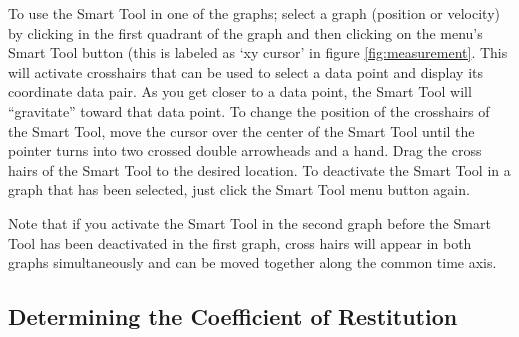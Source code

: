 To use the Smart Tool in one of the graphs; select a graph (position or velocity) by clicking in the first quadrant of the graph and then clicking on the menu's Smart Tool button (this is labeled as `xy cursor' in figure \ref{fig:measurement}.  This will activate crosshairs that can be used to select a data point and display its coordinate data pair.  As you get closer to a data point, the Smart Tool will ``gravitate'' toward that data point.  To change the position of the crosshairs of the Smart Tool, move the cursor over the center of the Smart Tool until the pointer turns into two crossed double arrowheads and a hand.  Drag the cross hairs of the Smart Tool to the desired location.  To deactivate the Smart Tool in a graph that has been selected, just click the Smart Tool menu button again.  \myskip

Note that if you activate the Smart Tool in the second graph before the Smart Tool has been deactivated in the first graph, cross hairs will appear in both graphs simultaneously and can be moved together along the common time axis.

\subsection{Determining the Coefficient of Restitution}

